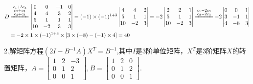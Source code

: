 \documentclass{article}
\begin{document}
\begin{jie}
\begin{align*}
D&\xlongequal{\substack{c_1+3c_3\\ c_2+c_3\\ c_4+c_3}}
\begin{vmatrix}
  0 & 0 & -1 & 0 \\
  4 & 4 & 3 & 2 \\
  5 & 1 & 1 & 1\\
   10 & -2 & 3 & 3
\end{vmatrix}=(-1)\times(-1)^{1+3}\begin{vmatrix}
  4 & 4 &  2 \\
  5 & 1 &  1\\
   10 & -2  & 3
\end{vmatrix}=-2
\begin{vmatrix}
  2 & 2 &  1 \\
  5 & 1 &  1\\
   10 & -2  & 3
\end{vmatrix}\xlongequal{\substack{c_1-2c_3\\ c_2-2c_3}}
-2\begin{vmatrix}
  0 & 0 &  1 \\
  3 & -1 &  1\\
   4 & -8  & 3
\end{vmatrix}\\ &=-2\times1\times(-1)^{1+3}\times[3\times(-8)-(-1)\times4]=40
\end{align*}
\end{jie}

2.解矩阵方程$(2I-B^{-1}A)X^{T}=B^{-1}$,其中$I$是3阶单位矩阵，$X^{T}$是3阶矩阵$X$的转置矩阵，$A=
\begin{bmatrix}
  1 & 2 & -3 \\
  0 & 1 & 2 \\
  0 & 0 & 1
\end{bmatrix},B=
\begin{bmatrix}
  1 & 2 & 0 \\
  0 & 1 & 2 \\
  0 & 0 & 1
\end{bmatrix}
$.
\end{document}
